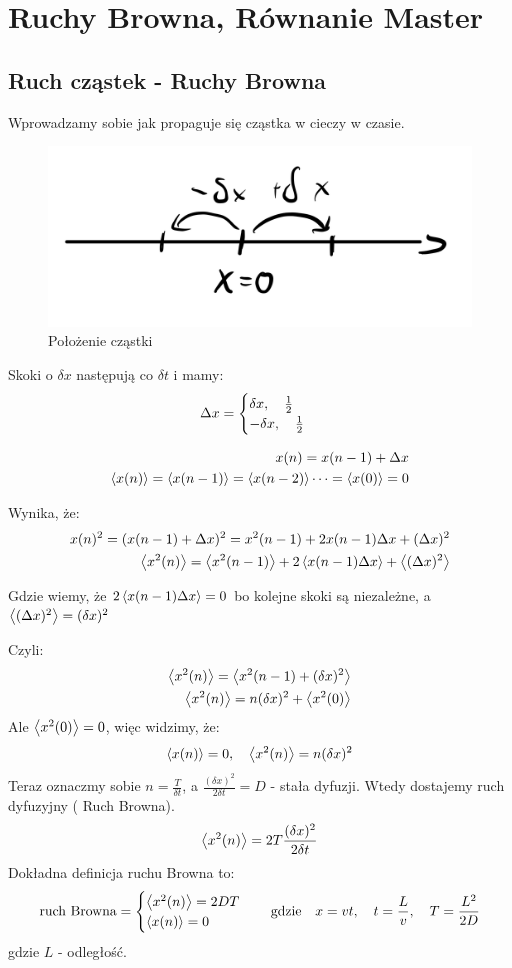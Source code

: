 \documentclass[12pt,a4paper]{report}
\newcommand{\ind}[1]{{\color{blue} #1\index{#1}}}
\newenvironment{lecture}[1]{\par\medskip
   \noindent\chapter{#1} \rmfamily}{\medskip}
\begin{document}
\begin{lecture}{Ruchy Browna, Równanie Master}
\section{Ruch cząstek - Ruchy Browna}

Wprowadzamy sobie jak propaguje się cząstka w cieczy w czasie.

\begin{figure}[!ht]
    \centering
    \includegraphics[width=0.8\linewidth]{Wyk_2_Rys_1.jpeg}
    \caption{Położenie cząstki}
    \label{fig:lec_2:czastka}
\end{figure}

Skoki o $\delta x$ następują co $\delta t$ i mamy:
\[ \Delta x = \begin{cases}
    \delta x \qc \frac{1}{2} \\
    - \delta x \qc \frac{1}{2}
\end{cases}\]

\begin{align*}
    x(n) = x(n-1) + \Delta x\\
    \expval{x(n)} = \expval{x(n-1)} = \expval{x(n-2)} \dots = \expval{x(0)} = 0
\end{align*}

Wynika, że:
\begin{align*}
    x(n)^2 = (x(n-1) + \Delta x)^2 = x^2(n-1) + 2x(n-1)\Delta x + (\Delta x)^2\\
    \expval{x^2(n)} = \expval{x^2(n-1)} + 2\expval{x(n-1)\Delta x} + \expval{(\Delta x)^2}
\end{align*}

Gdzie wiemy, że $2\expval{x(n-1)\Delta x} = 0$  bo kolejne skoki są niezależne, a $\expval{(\Delta x)^2} = (\delta x)^2$

Czyli:
\begin{align*}
    \expval{x^2(n)} = \expval{x^2(n-1) + (\delta x)^2}\\
    \expval{x^2(n)} = n (\delta x)^2 + \expval{x^2(0)}
\end{align*}
Ale $\expval{x^2(0)} = 0$, więc widzimy, że:
\[
    \expval{x(n)} = 0 \qc \expval{x^2(n)} = n (\delta x)^2
\]
Teraz oznaczmy sobie $n = \frac{T}{\delta t}$, a $\frac{(\delta x)^2}{2 \delta t} = D$ - stała dyfuzji. Wtedy dostajemy ruch dyfuzyjny (\ind{Ruch Browna}).
\[
    \expval{x^2(n)} = 2 T \frac{(\delta x)^2}{2 \delta t}
\]
Dokładna definicja ruchu Browna to:
\[
    \text{ruch Browna} = 
    \begin{cases}
    \expval{x^2(n)} = 2 D T \\
    \expval{x(n)} = 0
    \end{cases}\qq{gdzie}
    x = vt\qc t=\frac{L}{v}\qc T=\frac{L^2}{2D}
\] gdzie $L$ - odległość.


\end{lecture}
\end{document}
